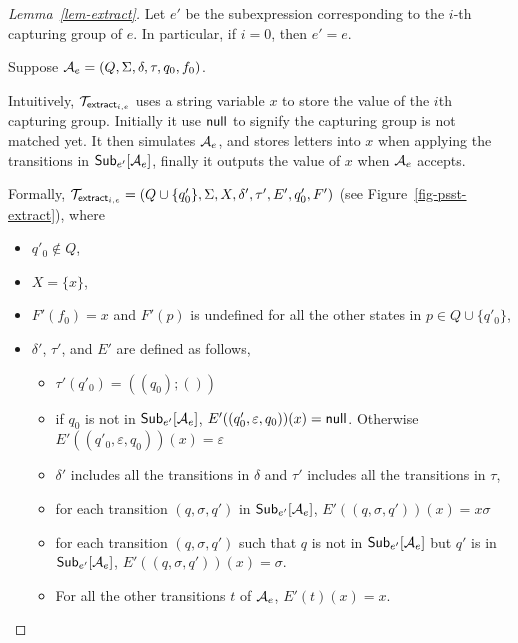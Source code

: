 \begin{proof}[Lemma~\ref{lem-extract}]
Let $e'$ be the subexpression corresponding to the $i$-th capturing group of $e$. In particular, if $i=0$, then $e' = e$. 

Suppose $\mathcal{A}_e = (Q, \Sigma, \delta, \tau, q_0, f_0)$. 

Intuitively, $\mathcal{T}_{\mathsf{extract}_{i,e}}$ uses a string variable $x$ to store the value of the $i$th capturing group. Initially it use $\mathsf{null}$ to signify the capturing group is not matched yet. It then simulates $\mathcal{A}_e$, and stores letters into $x$ when applying the transitions in ${\sf Sub}_{e'}[\mathcal{A}_e]$, finally it outputs the value of $x$ when $\mathcal{A}_e$ accepts.

Formally, $\mathcal{T}_{\mathsf{extract}_{i,e}} = (Q \cup \{q'_0\}, \Sigma, X, \delta', \tau', E', q'_0, F')$ (see Figure~\ref{fig-psst-extract}), where 
\begin{itemize}
\item $q'_0 \not \in Q$,
%
\item $X = \{x\}$,
%
%
\item $F'(f_0)= x$ and $F'(p)$ is undefined for all the other states in $p \in Q  \cup \{q'_0\}$,
%
\item $\delta'$, $\tau'$, and $E'$ are defined as follows,
\begin{itemize}
\item $\tau'(q'_0) = ((q_0); ())$
\item if $q_0$ is not in ${\sf Sub}_{e'}[\mathcal{A}_e]$, $E'((q'_0, \varepsilon, q_0))(x) = \mathsf{null}$. Otherwise $E'((q'_0, \varepsilon, q_0))(x) = \varepsilon$
%
\item $\delta'$ includes all the transitions in $\delta$ and $\tau'$ includes all the transitions in $\tau$,
%
\item for each transition $(q, \sigma, q')$ in ${\sf Sub}_{e'}[\mathcal{A}_e]$, $E'((q, \sigma, q'))(x) = x \sigma$ 
\item for each transition $(q, \sigma, q')$ such that $q$ is not in ${\sf Sub}_{e'}[\mathcal{A}_e]$ but $q'$ is in ${\sf Sub}_{e'}[\mathcal{A}_e]$, $E'((q, \sigma, q'))(x) = \sigma$.
\item For all the other transitions $t$ of $\mathcal{A}_e$, $E'(t)(x) = x$.
%
%
\end{itemize}
\end{itemize}


\end{proof}
